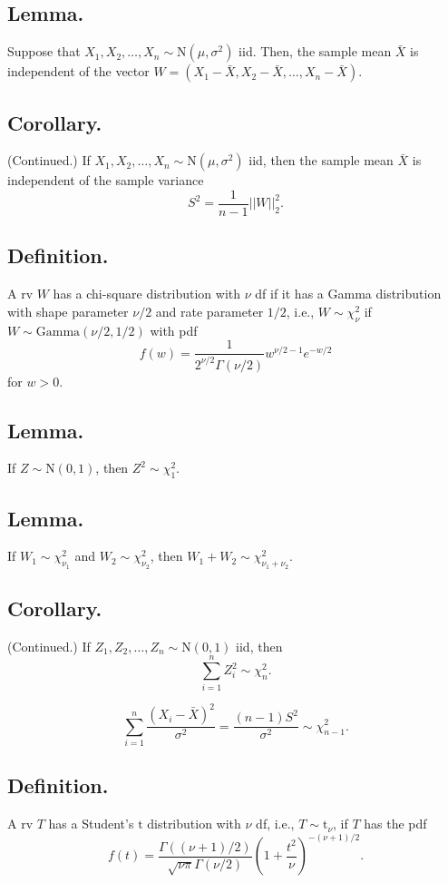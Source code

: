 \documentclass[titlepage]{article}
\begin{document}
\subsection{Lemma.} Suppose that $X_{1}, X_{2}, \ldots, X_{n} \sim \text{N}(\mu, \sigma^{2})$ iid. Then, the sample mean $\bar{X}$ is independent of the vector $W = (X_{1} - \bar{X}, X_{2} - \bar{X}, \ldots, X_{n} - \bar{X})$.

\subsection{Corollary.} (Continued.) If $X_{1}, X_{2}, \ldots, X_{n} \sim \text{N}(\mu, \sigma^{2})$ iid, then the sample mean $\bar{X}$ is independent of the sample variance 
$$S^{2} = \frac{1}{n-1}||W||_{2}^{2}.$$

\subsection{Definition.} A rv $W$ has a chi-square distribution with $\nu$ df if it has a Gamma distribution with shape parameter $\nu/2$ and rate parameter $1/2$, i.e., $W \sim \chi_{\nu}^{2}$ if $W \sim \text{Gamma}(\nu/2, 1/2)$ with pdf 
$$f(w) = \frac{1}{2^{\nu/2}\Gamma(\nu/2)}w^{\nu/2-1}e^{-w/2}$$
for $w > 0$.

\subsection{Lemma.} If $Z \sim \text{N}(0, 1)$, then $Z^{2} \sim \chi_{1}^{2}$.

\subsection{Lemma.} If $W_{1} \sim \chi_{\nu_{1}}^{2}$ and $W_{2} \sim \chi_{\nu_{2}}^{2}$, then $W_{1} + W_{2} \sim \chi_{\nu_{1} + \nu_{2}}^{2}$.

\subsection{Corollary.} (Continued.) If $Z_{1}, Z_{2}, \ldots, Z_{n} \sim \text{N}(0, 1)$ iid, then 
$$\sum_{i=1}^{n}Z_{i}^{2} \sim \chi_{n}^{2}.$$

$$\sum_{i=1}^{n}\frac{(X_{i}-\bar{X})^{2}}{\sigma^{2}} = \frac{(n-1)S^{2}}{\sigma^{2}} \sim \chi_{n-1}^{2}.$$

\subsection{Definition.} A rv $T$ has a Student's $\text{t}$ distribution with $\nu$ df, i.e., $T \sim \text{t}_{\nu}$, if $T$ has the pdf
$$f(t) = \frac{\Gamma((\nu+1)/2)}{\sqrt{\nu\pi}\Gamma(\nu/2)}\left(1 + \frac{t^{2}}{\nu}\right)^{-(\nu+1)/2}.$$
\end{document}

